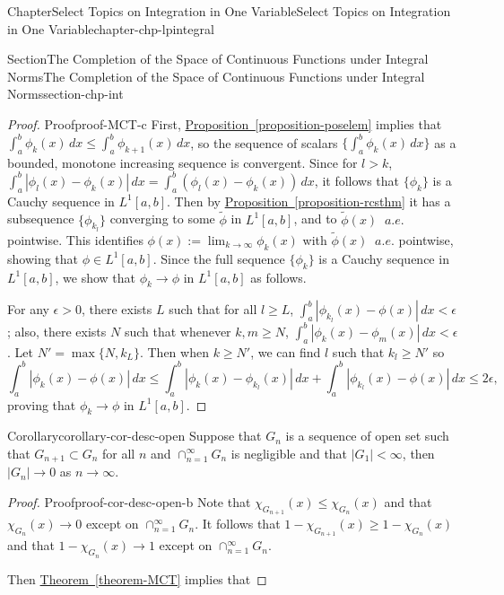 \documentclass[oneside,10pt,]{book}
\newcommand{\xreffont}{\relax}
\numberwithin{equation}{section}
\begin{document}
\begin{chapterptx}{Chapter}{Select Topics on Integration in One Variable}{}{Select Topics on Integration in One Variable}{}{}{chapter-chp-lpintegral}
\begin{sectionptx}{Section}{The Completion of the Space of Continuous Functions under Integral Norms}{}{The Completion of the Space of Continuous Functions under Integral Norms}{}{}{section-chp-int}
\begin{proof}{Proof}{}{proof-MCT-c}
First, \hyperref[proposition-poselem]{Proposition~{\xreffont\ref{proposition-poselem}}} implies that \(\int_{a}^{b} \phi_{k}(x)\, dx \le \int_{a}^{b} \phi_{k+1}(x)\, dx\), so the sequence of scalars \(\{ \int_{a}^{b} \phi_{k}(x)\, dx\}\) as a bounded, monotone increasing sequence is convergent. Since for \(l > k\), \(\int_{a}^{b} |\phi_{l}(x)-\phi_{k}(x)|\, dx= \int_{a}^{b} (\phi_{l}(x)-\phi_{k}(x))\, dx\), it follows that \(\{ \phi_{k}\}\) is a Cauchy sequence in \(L^{1}[a, b]\). Then by \hyperref[proposition-rcsthm]{Proposition~{\xreffont\ref{proposition-rcsthm}}} it has a subsequence \(\{ \phi_{k_{l}}\}\) converging to some \(\tilde \phi\) in \(L^{1}[a, b]\), and to \(\tilde \phi (x)\) \(\ a.e.\) pointwise. This identifies \(\phi (x) :=\lim_{k\to \infty} \phi_{k}(x)\) with \(\tilde \phi(x)\) \(\ a.e.\) pointwise, showing that \(\phi \in L^{1}[a, b]\). Since the full sequence \(\{ \phi_{k}\}\) is a Cauchy sequence in \(L^{1}[a, b]\), we show that \(\phi_{k} \to \phi\) in \(L^{1}[a, b]\) as follows.%
\par
For any \(\epsilon > 0\), there exists \(L\) such that for all \(l\ge L\), \(\int_{a}^{b}|\phi_{k_{l}}(x)-\phi(x)|\, dx < \epsilon\); also, there exists \(N\) such that whenever \(k, m\ge N\), \(\int_{a}^{b}|\phi_{k}(x)-\phi_{m}(x)|\, dx < \epsilon\). Let \(N'=\max\{N, k_{L}\}\). Then when \(k \ge N'\), we can find \(l\) such that \(k_{l} \ge N'\) so%
\begin{equation*}
\int_{a}^{b}|\phi_{k}(x)-\phi(x)|\, dx \le \int_{a}^{b}|\phi_{k}(x)-\phi_{k_{l}}(x)|\, dx
+ \int_{a}^{b}|\phi_{k_{l}}(x)-\phi(x)|\, dx \le 2\epsilon,
\end{equation*}
proving that \(\phi_{k} \to \phi\) in \(L^{1}[a, b]\).%
\end{proof}
\begin{corollary}{Corollary}{}{}{corollary-cor-desc-open}%
Suppose that \(G_{n}\) is a sequence of open set such that \(G_{n+1}\subset G_{n}\) for all \(n\) and \(\cap_{n=1}^{\infty}G_{n}\) is negligible and that \(|G_{1}| < \infty\), then  \(|G_{n}|\to 0\) as \(n\to \infty\).\end{corollary}
\begin{proof}{Proof}{}{proof-cor-desc-open-b}
Note that \(\chi_{G_{n+1}}(x)\le \chi_{G_{n}}(x)\) and that \(\chi_{G_{n}}(x) \to 0\) except on \(\cap_{n=1}^{\infty}G_{n}\). It follows that \(1- \chi_{G_{n+1}}(x)\ge 1- \chi_{G_{n}}(x)\) and that \(1- \chi_{G_{n}}(x)\to 1\) except on \(\cap_{n=1}^{\infty}G_{n}\).%
\par
Then \hyperref[theorem-MCT]{Theorem~{\xreffont\ref{theorem-MCT}}} implies that%

\end{proof}
\end{sectionptx}
\end{chapterptx}
\end{document}
